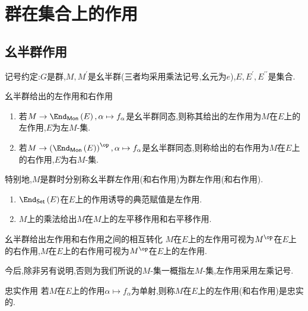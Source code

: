 \chapter{群在集合上的作用}

\section{幺半群作用}

记号约定:$G$是群,$M,M^{\prime}$是幺半群(三者均采用乘法记号,幺元为$e$),$E,E^{\prime},E^{\prime\prime}$是集合.

\begin{definition}{幺半群给出的左作用和右作用}{}
	\begin{enumerate}
		\item 若$M\to\End_{\mathsf{Mon}}\left(E\right),\alpha\mapsto f_{\alpha}$是幺半群同态,则称其给出的左作用为$M$在$E$上的左作用,$E$为左$M$-集.
		\item 若$M\to\left(\End_{\mathsf{Mon}}\left(E\right)\right)^{\op},\alpha\mapsto f_{\alpha}$是幺半群同态,则称给出的右作用为$M$在$E$上的右作用,$E$为右$M$-集.
	\end{enumerate}
	特别地,$M$是群时分别称幺半群左作用(和右作用)为群左作用(和右作用).
\end{definition}

\begin{example}{}{}
	\begin{enumerate}
		\item $\End_{\mathsf{Set}}\left(E\right)$在$E$上的作用诱导的典范赋值是左作用.
		\item $M$上的乘法给出$M$在$M$上的左平移作用和右平移作用.
	\end{enumerate}
\end{example}

\begin{proposition}{幺半群给出左作用和右作用之间的相互转化}{}
	$M$在$E$上的左作用可视为$M^{\op}$在$E$上的右作用,$M$在$E$上的右作用可视为$M^{\op}$在$E$上的左作用.
\end{proposition}

\begin{convention}{}{}
	今后,除非另有说明,否则为我们所说的$M$-集一概指左$M$-集,左作用采用左乘记号.
\end{convention}

\begin{definition}{忠实作用}{}
	若$M$在$E$上的作用$\alpha\mapsto f_{\alpha}$为单射,则称$M$在$E$上的左作用(和右作用)是忠实的.
\end{definition}


